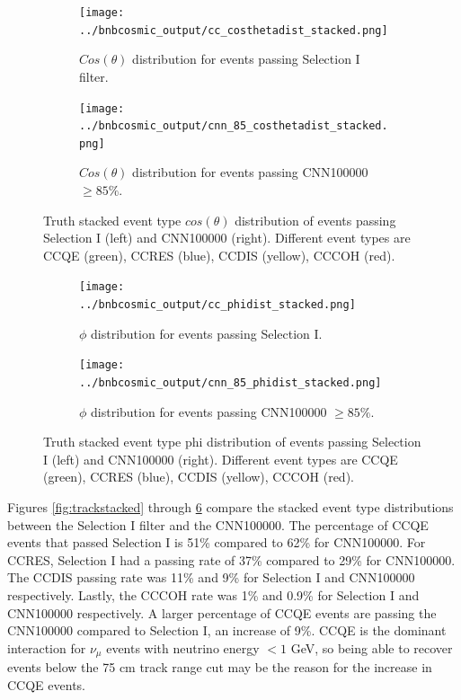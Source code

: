 \begin{figure}[htp!]
\centering
	\begin{subfigure}[b]{.475\textwidth}
	\centering
		\texttt{[image: ../bnbcosmic\_output/cc\_costhetadist\_stacked.png]}
		\caption{$Cos(\theta)$ distribution for events passing Selection I filter.} 
		\label{fig:cccosthetastacked}
	\end{subfigure}
	\quad
	\begin{subfigure}[b]{.475\textwidth}
	\centering
		\texttt{[image: ../bnbcosmic\_output/cnn\_85\_costhetadist\_stacked.png]}
		\caption{$Cos(\theta)$ distribution for events passing CNN100000 $\geq 85\%$.} 
		\label{fig:cnn85costhetastacked}
	\end{subfigure}
\caption{Truth stacked event type $cos(\theta)$ distribution of events passing Selection I (left) and CNN100000 (right). Different event types are CCQE (green), CCRES (blue), CCDIS (yellow), CCCOH (red).}
\label{fig:costhetastacked}
\end{figure}

\begin{figure}[htp!]
\centering
	\begin{subfigure}[b]{.475\textwidth}
	\centering
		\texttt{[image: ../bnbcosmic\_output/cc\_phidist\_stacked.png]}
		\caption{$\phi$ distribution for events passing Selection I.} 
		\label{fig:ccphistacked}
	\end{subfigure}
	\quad
	\begin{subfigure}[b]{.475\textwidth}
	\centering
		\texttt{[image: ../bnbcosmic\_output/cnn\_85\_phidist\_stacked.png]}
		\caption{$\phi$ distribution for events passing CNN100000 $\geq 85\%$.} 
		\label{fig:cnn85phistacked}
	\end{subfigure}
\caption{Truth stacked event type phi distribution of events passing Selection I (left) and CNN100000 (right). Different event types are CCQE (green), CCRES (blue), CCDIS (yellow), CCCOH (red).}
\label{fig:phistacked}
\end{figure}
Figures \ref{fig:trackstacked} through \ref{fig:phistacked} compare the stacked event type distributions between the Selection I filter and the CNN100000. The percentage of CCQE events that passed Selection I is 51\% compared to 62\% for CNN100000. For CCRES, Selection I had a passing rate of 37\% compared to 29\% for CNN100000. The CCDIS passing rate was 11\% and 9\% for Selection I and CNN100000 respectively. Lastly, the CCCOH rate was 1\% and 0.9\% for Selection I and CNN100000 respectively. A larger percentage of CCQE events are passing the CNN100000 compared to Selection I, an increase of 9\%. CCQE is the dominant interaction for $\nu_{\mu}$ events with neutrino energy $<1$ GeV, so being able to recover events below the 75 cm track range cut may be the reason for the increase in CCQE events. 
  
